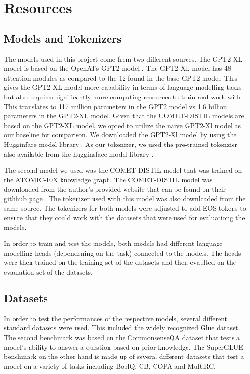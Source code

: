 \documentclass[\main/thesis.tex]{subfiles}
\begin{document}
\chapter{Resources}\label{sec:resources} 


\section{Models and Tokenizers}\label{sec:models}

The models used in this project come from two different sources. The GPT2-XL model is based on the OpenAI's GPT2 model 
\cite{radford_language_nodate}. The GPT2-XL model has 48 attention modules as compared to the 12 found in the base 
GPT2 model. This gives the GPT2-XL model more capability in terms of language modelling tasks but also requires 
significantly more computing resources to train and work with \cite{noauthor_pretrained_nodate}. This translates to 117 
million parameters in the GPT2 model vs 1.6 billion parameters in the GPT2-XL model. Given that the COMET-DISTIL models
are based on the GPT2-XL model, we opted to utilize the naive GPT2-Xl model as our baseline for comparison. We 
downloaded the GPT2-Xl model by using the Hugginface model library \cite{noauthor_gpt2-xl_nodate}. As our tokenizer, we 
used the pre-trained tokenzier also available from the hugginsface model library \cite{noauthor_gpt2-xl_nodate}. 

The second model we used was the COMET-DISTIL model \cite{west_symbolic_2021} that was trained on the ATOMIC-10X 
knowledge graph. The COMET-DISTIL model was downloaded from the author's provided website that can be found on their 
githhub page \cite{peterwestai2_symbolic_2022}. The tokenizer used with this model was also downloaded from the same 
source. The tokenizers for both models were adjusted to add EOS tokens to ensure that they could work with the datasets 
that were used for evaluationg the models. 

In order to train and test the models, both models had different language modelling heads (dependening on the task) 
connected to the models. The heads were then trained on the training set of the datasets and then evaulted on 
the evaulation set of the datasets. 

\section{Datasets}\label{sec:datasets}
In order to test the performances of the respective models, several different standard datasets were used. This 
included the widely recognized Glue dataset\cite{}. The second benchmark was based on the 
CommonsenseQA dataset\cite{talmor_commonsenseqa_2018} that tests a model's ability to answer a question based on prior 
knowledge. The SuperGLUE benchmark on the other hand is made up of several different datasets that test a model on a 
variety of tasks including BoolQ, CB, COPA and MultiRC.
\end{document}
